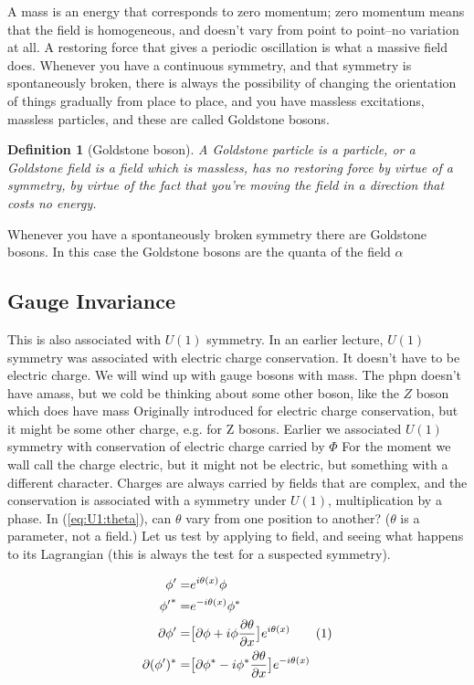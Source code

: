 \documentclass[]{article}
\newcommand\numberthis{\addtocounter{equation}{1}\tag{\theequation}}
\newtheorem{defn}[thm]{Definition}
\begin{document}
A mass is an energy that corresponds to zero momentum; zero momentum means that the field is homogeneous, and doesn't vary from point to point--no variation at all. A restoring force that gives a periodic oscillation is what a massive field does. Whenever you have a continuous symmetry, and that symmetry is spontaneously broken, there is always the possibility of changing the orientation of things gradually from place to place, and you have massless excitations, massless particles, and these are called Goldstone bosons.
\begin{defn}[Goldstone boson]
	 A Goldstone particle is a particle, or a Goldstone field is a field which is massless, has no restoring force by virtue of a symmetry, by virtue of the fact that you're moving the field in a direction that costs no energy.
\end{defn}
 Whenever you have a spontaneously broken symmetry there are Goldstone bosons. In this case the Goldstone bosons are the quanta of the field $\alpha$

\subsection{Gauge Invariance}\label{section:gauge:invariance}

This is also associated with $U(1)$ symmetry. In an earlier lecture, $U(1)$ symmetry was associated with electric charge conservation. It doesn't have to be electric charge. We will wind up with gauge bosons with mass. The phpn doesn't have amass, but we cold be thinking about some other boson, like the $Z$ boson which does have mass  Originally introduced for electric charge conservation, but it might be some other charge, e.g. for Z bosons. Earlier we associated $U(1)$ symmetry with conservation of electric charge carried by $\Phi$ For the moment we wall call the charge electric, but it might not be electric, but something with a different character. Charges are always carried by fields that are complex, and the conservation is associated with a symmetry under $U(1)$, multiplication by a phase.  In (\ref{eq:U1:theta}), can $\theta$ vary from one position to another? ($\theta$ is a parameter, not a field.) Let us test by applying to field, and seeing what happens to its Lagrangian (this is always the test for a suspected symmetry).

\begin{align*}
	\phi^\prime =& e^{i \theta(x)} \phi \\
	{\phi^\prime}^* =& e^{-i \theta(x)} \phi^*\\
	\partial \phi^\prime =& \big[\partial \phi + i \phi \frac{\partial \theta}{\partial x}\big] e^{i \theta(x)} \numberthis \label{eq:phi:dash:deriv}\\
	\partial (\phi^\prime)^* =& \big[\partial \phi^* - i \phi^* \frac{\partial \theta}{\partial x}\big] e^{-i \theta(x)}
\end{align*}
\end{document}
